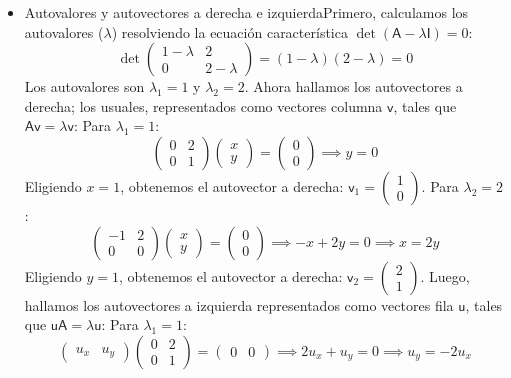 \documentclass[11pt,spanish]{article}
\newcommand{\mat}[1]{\mathsf{#1}}
\begin{document}
\begin{itemize}
\item Autovalores y autovectores a derecha e izquierdaPrimero, calculamos los autovalores ($\lambda$) resolviendo la ecuación característica $\det(\mat{A} - \lambda\mat{I}) = 0$:
$$
\det \begin{pmatrix} 1-\lambda & 2 \\ 0 & 2-\lambda \end{pmatrix} = (1-\lambda)(2-\lambda) = 0
$$
Los autovalores son $\lambda_1 = 1$ y $\lambda_2 = 2$.
Ahora hallamos los autovectores a derecha; los usuales, representados como vectores columna $\mat{v}$, tales que $\mat{A}\mat{v} = \lambda\mat{v}$:
Para $\lambda_1 = 1$:
$$
\begin{pmatrix} 0 & 2 \\ 0 & 1 \end{pmatrix} \begin{pmatrix} x \\ y \end{pmatrix} = \begin{pmatrix} 0 \\ 0 \end{pmatrix} \implies y = 0
$$
Eligiendo $x=1$, obtenemos el autovector a derecha: $\mat{v}_1 = \begin{pmatrix} 1 \\ 0 \end{pmatrix}$.
Para $\lambda_2 = 2$:
$$
\begin{pmatrix} -1 & 2 \\ 0 & 0 \end{pmatrix} \begin{pmatrix} x \\ y \end{pmatrix} = \begin{pmatrix} 0 \\ 0 \end{pmatrix} \implies -x + 2y = 0 \implies x = 2y
$$
Eligiendo $y=1$, obtenemos el autovector a derecha: $\mat{v}_2 = \begin{pmatrix} 2 \\ 1 \end{pmatrix}$.
Luego, hallamos los autovectores a izquierda representados como vectores fila $\mat{u}$, tales que $\mat{u}\mat{A} = \lambda\mat{u}$: 
Para $\lambda_1 = 1$:
$$
\begin{pmatrix} u_x & u_y \end{pmatrix} \begin{pmatrix} 0 & 2 \\ 0 & 1 \end{pmatrix} = \begin{pmatrix} 0 & 0 \end{pmatrix} \implies 2u_x + u_y = 0 \implies u_y = -2u_x
$$
\end{itemize}
\end{document}
